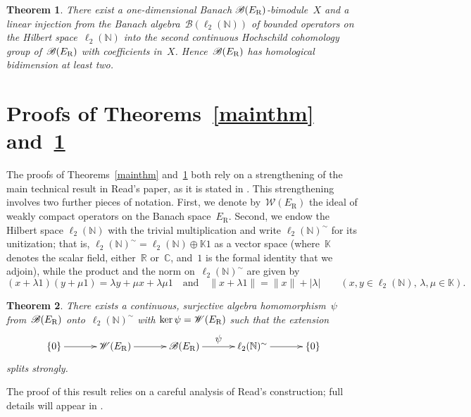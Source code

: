\documentclass[11pt,reqno]{amsart}
\newtheorem{theorem}{Theorem}[section]
\theoremstyle{definition}
\numberwithin{equation}{section}
\newcommand{\N}{\mathbb{N}}
\newcommand{\R}{\mathbb{R}}
\newcommand{\C}{\mathbb{C}}
\newcommand{\K}{\mathbb{K}}
\begin{document}
\begin{theorem}\label{mainthmH2BER}
There exist a one-dimensional Banach
$\mathscr{B}(E_{\text{\normalfont{R}}})$-bimodule~$X$ and a linear
in\-jec\-tion from the Banach algebra~$\mathscr{B}(\ell_2(\N))$ of
bounded operators on the Hilbert space~$\ell_2(\N)$ into the second
continuous Hochschild cohomology group
of~$\mathscr{B}(E_{\text{\normalfont{R}}})$ with coefficients in~$X$.
Hence~$\mathscr{B}(E_{\text{\normalfont{R}}})$ has homological
bidimension at least two.
\end{theorem}

\section{Proofs of Theorems~\ref{mainthm} and~\ref{mainthmH2BER}}
\noindent
The proofs of Theorems~\ref{mainthm} and~\ref{mainthmH2BER} both rely
on a strengthening of the main technical result in Read's paper, as it
is stated in \cite[Section~4]{read}. This strengthening involves two
further pieces of notation.  First, we denote
by~$\mathscr{W}(E_{\text{R}})$ the ideal of weakly compact operators
on the Banach space~$E_{\text{R}}$. Second, we endow the Hilbert space
$\ell_2(\N)$ with the trivial multiplication and write
$\ell_2(\N)^{\sim}$ for its unitization; that is, $\ell_2(\N)^{\sim} =
\ell_2(\N)\oplus\K 1$ as a vector space (where~$\K$ denotes the scalar
field, either~$\R$ or~$\C$, and~$1$ is the formal identity that we
adjoin), while the product and the norm on~$\ell_2(\N)^{\sim}$ are
given by
\[ (x + \lambda
1)(y+\mu 1) =
\lambda y+\mu x+ \lambda\mu 1\quad
\text{and}\quad \|x + \lambda 1\| = \|x\|
+ |\lambda|\qquad (x,y\in\ell_2(\N),\, \lambda,\mu\in\mathbb{K}). \]

\begin{theorem}\label{WEBEsplitexact} There exists a continuous, 
surjective algebra homomorphism~$\psi$ 
from~$\mathscr{B}(E_{\normalfont{\text{R}}})$
onto~$\ell_2(\N)^{\sim}$ with $\ker\psi =
\mathscr{W}(E_{\normalfont{\text{R}}})$ such that the extension 
\[ \spreaddiagramcolumns{2ex}\xymatrix{\{0\}\ar[r] &
    \mathscr{W}(E_{\normalfont{\text{R}}})\ar[r] &
    \mathscr{B}(E_{\normalfont{\text{R}}})\ar^-{\displaystyle{\psi}}[r]
    & \ell_2(\N)^{\sim}\ar[r] & \{0\}}
\] splits strongly.
\end{theorem}

The proof of this result relies on a careful analysis of Read's
construction; full details will appear in \cite{LS}.
\end{document}
